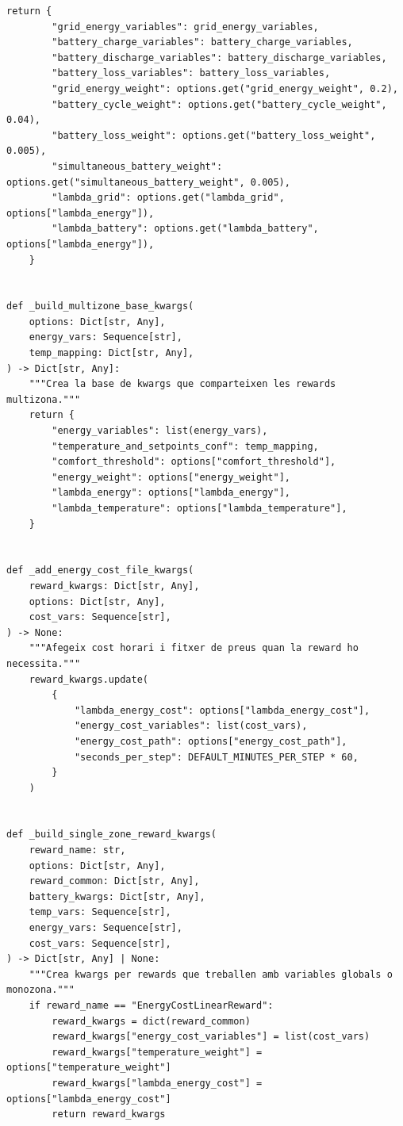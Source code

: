 \documentclass[10pt,a4paper]{article}
\begin{document}
\begin{lstlisting}[style=studioPython,caption={backend/entrenar\_agent\_rewards.py},label={lst:backend-entrenar-agent-rewards-py}]
    return {
        "grid_energy_variables": grid_energy_variables,
        "battery_charge_variables": battery_charge_variables,
        "battery_discharge_variables": battery_discharge_variables,
        "battery_loss_variables": battery_loss_variables,
        "grid_energy_weight": options.get("grid_energy_weight", 0.2),
        "battery_cycle_weight": options.get("battery_cycle_weight", 0.04),
        "battery_loss_weight": options.get("battery_loss_weight", 0.005),
        "simultaneous_battery_weight": options.get("simultaneous_battery_weight", 0.005),
        "lambda_grid": options.get("lambda_grid", options["lambda_energy"]),
        "lambda_battery": options.get("lambda_battery", options["lambda_energy"]),
    }


def _build_multizone_base_kwargs(
    options: Dict[str, Any],
    energy_vars: Sequence[str],
    temp_mapping: Dict[str, Any],
) -> Dict[str, Any]:
    """Crea la base de kwargs que comparteixen les rewards multizona."""
    return {
        "energy_variables": list(energy_vars),
        "temperature_and_setpoints_conf": temp_mapping,
        "comfort_threshold": options["comfort_threshold"],
        "energy_weight": options["energy_weight"],
        "lambda_energy": options["lambda_energy"],
        "lambda_temperature": options["lambda_temperature"],
    }


def _add_energy_cost_file_kwargs(
    reward_kwargs: Dict[str, Any],
    options: Dict[str, Any],
    cost_vars: Sequence[str],
) -> None:
    """Afegeix cost horari i fitxer de preus quan la reward ho necessita."""
    reward_kwargs.update(
        {
            "lambda_energy_cost": options["lambda_energy_cost"],
            "energy_cost_variables": list(cost_vars),
            "energy_cost_path": options["energy_cost_path"],
            "seconds_per_step": DEFAULT_MINUTES_PER_STEP * 60,
        }
    )


def _build_single_zone_reward_kwargs(
    reward_name: str,
    options: Dict[str, Any],
    reward_common: Dict[str, Any],
    battery_kwargs: Dict[str, Any],
    temp_vars: Sequence[str],
    energy_vars: Sequence[str],
    cost_vars: Sequence[str],
) -> Dict[str, Any] | None:
    """Crea kwargs per rewards que treballen amb variables globals o monozona."""
    if reward_name == "EnergyCostLinearReward":
        reward_kwargs = dict(reward_common)
        reward_kwargs["energy_cost_variables"] = list(cost_vars)
        reward_kwargs["temperature_weight"] = options["temperature_weight"]
        reward_kwargs["lambda_energy_cost"] = options["lambda_energy_cost"]
        return reward_kwargs


\end{lstlisting}
\end{document}
